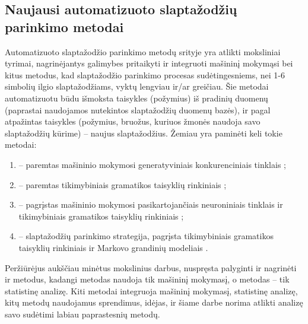 \documentclass{VUMIFInfBakalaurinis}
\begin{document}
\subsection{Naujausi automatizuoto slaptažodžių parinkimo metodai}
Automatizuoto slaptažodžio parinkimo metodų srityje yra atlikti moksliniai 
tyrimai, nagrinėjantys galimybes pritaikyti ir integruoti mašininį mokymąsi bei 
kitus metodus, kad slaptažodžio parinkimo procesas sudėtingesniems, nei 1-6 
simbolių ilgio slaptažodžiams, vyktų lengviau ir/ar greičiau. Šie metodai 
automatizuotu būdu išmoksta taisykles (požymius) iš pradinių duomenų (paprastai 
naudojamos nutekintos slaptažodžių duomenų bazės), ir pagal atpažintas
taisykles (požymius, bruožus, kuriuos žmonės naudoja savo slaptažodžių kūrime) 
-- naujus slaptažodžius. Žemiau yra paminėti keli tokie metodai:
\begin{enumerate}
  \item {} -- paremtas mašininio mokymosi generatyviniais 
    konkurenciniais tinklais \cite{PassGAN};
  \item {} -- paremtas tikimybiniais gramatikos taisyklių 
    rinkiniais \cite{PCFG1,PCFG2};
  \item {} -- pagrįstas mašininio mokymosi pasikartojančiais 
    neuroniniais tinklais ir tikimybiniais gramatikos taisyklių rinkiniais 
    \cite{GenPASS};
  \item {} -- slaptažodžių parinkimo strategija, pagrįsta 
    tikimybiniais gramatikos taisyklių rinkiniais ir Markovo grandinių modeliais 
    \cite{TG-SPSR}.
\end{enumerate}

Peržiūrėjus aukščiau minėtus mokslinius darbus, nuspręsta palyginti ir nagrinėti 
 ir  metodus, kadangi  
metodas naudoja tik mašininį mokymasį, o  metodas -- tik 
statistinę analizę. Kiti metodai integruoja mašininį mokymasį, statistinę 
analizę, kitų metodų naudojamus sprendimus, idėjas, ir šiame darbe norima 
atlikti analizę savo sudėtimi labiau paprastesnių metodų.


\end{document}
